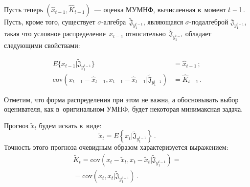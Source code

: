 \begin{multicols}{2}
    Пусть теперь $(\hat{x}_{t-1}, \hat{K}_{t-1})$~--- оценка МУМНФ, 
вычисленная в~момент $t\hm-1$. Пусть, кроме того, существует  
$\sigma$-ал\-геб\-ра~$\tilde{\mathfrak{J}}_{y_1^{t-1}}$, являющаяся  
$\sigma$-под\-ал\-геб\-рой $\mathfrak{J}_{y_1^{t-1}}$, такая что условное распределение~$x_{t-1}$ 
относительно~$\tilde{\mathfrak{J}}_{y_1^{t-1}}$ обладает следующими 
свойствами: 

\vspace*{-9pt}

\noindent
\begin{align*}
E\{ x_{t-1}\vert \tilde{\mathfrak{J}}_{y_1^{t-1}} \}& = 
\hat{x}_{t-1}\,;\\
\mathrm{cov}\left (x_{t-1} - \hat{x}_{t-1}, x_{t-1}- \hat{x}_{t-1} \vert 
\tilde{\mathfrak{J}}_{y_1^{t-1}}\right)&= \hat{K}_{t-1}\,.
\end{align*}

\noindent
 Отметим, что форма 
распределения при этом не важна, а обосновывать выбор оценивателя, как 
в~оригинальном УМНФ, будет некоторая минимаксная задача.
    
    Прогноз $\tilde{x}_t$ будем искать в~виде:
    \begin{equation}
    \tilde{x}_t=E\left\{ x_t\vert \tilde{\mathfrak{J}}_{y_1^{t-1}} \right\}\,.
    \label{e8-bos}
    \end{equation}
        Точность этого прогноза очевидным образом характеризуется выражением:
    \begin{multline}
    \tilde{K}_t=\mathrm{cov} \left( x_t-\tilde{x}_t, x_t-\tilde{x}_t\vert 
\tilde{\mathfrak{J}}_{y_1^{t-1}}\right) ={}\\
{}=\mathrm{cov} \left(  x_t, x_t\vert  \tilde{\mathfrak{J}}_{y_1^{t-1}}\right)\,.
    \label{e9-bos}
    \end{multline}
    

\end{multicols}
